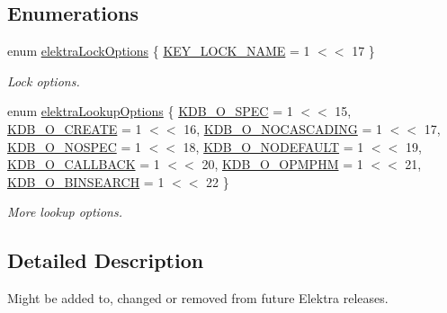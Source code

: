\subsection*{Enumerations}
\begin{DoxyCompactItemize}
\item 
enum \hyperlink{group__proposal_ga824e384e248ed1e05448294bff7271c0}{elektra\+Lock\+Options} \{ \hyperlink{group__proposal_gga824e384e248ed1e05448294bff7271c0a4813b0cfdefeb676e35f599ef763c265}{K\+E\+Y\+\_\+\+L\+O\+C\+K\+\_\+\+N\+A\+ME} = 1 $<$$<$ 17
 \}\begin{DoxyCompactList}\small\item\em Lock options. \end{DoxyCompactList}
\item 
enum \hyperlink{group__proposal_ga93673533c4c8eb1fdfca76b98c5f49b0}{elektra\+Lookup\+Options} \{ \newline
\hyperlink{group__proposal_gga93673533c4c8eb1fdfca76b98c5f49b0a187bc7e52493fb8f1eb5693015478dae}{K\+D\+B\+\_\+\+O\+\_\+\+S\+P\+EC} = 1 $<$$<$ 15, 
\hyperlink{group__proposal_gga93673533c4c8eb1fdfca76b98c5f49b0a72155bedec545b2e96372ab28169620a}{K\+D\+B\+\_\+\+O\+\_\+\+C\+R\+E\+A\+TE} = 1 $<$$<$ 16, 
\hyperlink{group__proposal_gga93673533c4c8eb1fdfca76b98c5f49b0abc4c6e04823b6d684f4db8df3b84f326}{K\+D\+B\+\_\+\+O\+\_\+\+N\+O\+C\+A\+S\+C\+A\+D\+I\+NG} = 1 $<$$<$ 17, 
\hyperlink{group__proposal_gga93673533c4c8eb1fdfca76b98c5f49b0a420d8ea3671ffea4fe8400570cfe5c8d}{K\+D\+B\+\_\+\+O\+\_\+\+N\+O\+S\+P\+EC} = 1 $<$$<$ 18, 
\newline
\hyperlink{group__proposal_gga93673533c4c8eb1fdfca76b98c5f49b0abdcfd6d28200b5c650615fba430496bb}{K\+D\+B\+\_\+\+O\+\_\+\+N\+O\+D\+E\+F\+A\+U\+LT} = 1 $<$$<$ 19, 
\hyperlink{group__proposal_gga93673533c4c8eb1fdfca76b98c5f49b0a70ac5d04d6f855e17e4c33dfeeddd39e}{K\+D\+B\+\_\+\+O\+\_\+\+C\+A\+L\+L\+B\+A\+CK} = 1 $<$$<$ 20, 
\hyperlink{group__proposal_gga93673533c4c8eb1fdfca76b98c5f49b0afe9f6ff6e374540baf600a918b07ee6e}{K\+D\+B\+\_\+\+O\+\_\+\+O\+P\+M\+P\+HM} = 1 $<$$<$ 21, 
\hyperlink{group__proposal_gga93673533c4c8eb1fdfca76b98c5f49b0ac67a43bd273203575090d26010f6c995}{K\+D\+B\+\_\+\+O\+\_\+\+B\+I\+N\+S\+E\+A\+R\+CH} = 1 $<$$<$ 22
 \}\begin{DoxyCompactList}\small\item\em More lookup options. \end{DoxyCompactList}
\end{DoxyCompactItemize}


\subsection{Detailed Description}
Might be added to, changed or removed from future Elektra releases. 



